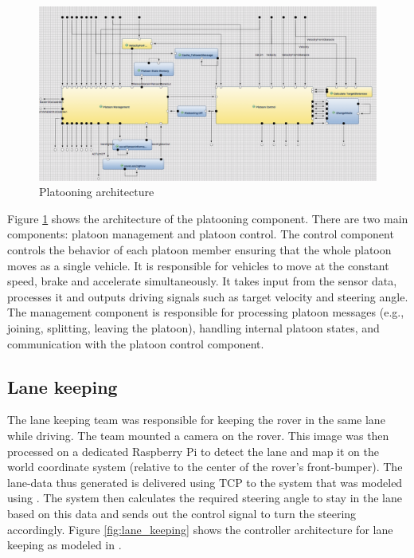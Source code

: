 \begin{figure}[!h]
	\centering
	\includegraphics[width=1\textwidth]{./img/platooningArchitecture.png}
	\caption{Platooning architecture}
	\label{fig:platooning}
\end{figure}

Figure \ref{fig:platooning} shows the architecture of the platooning component. There are two main components: platoon management and platoon control. The control component controls the behavior of each platoon member ensuring that the whole platoon moves as a single vehicle. It is responsible for vehicles to move at the constant speed, brake and accelerate simultaneously. It takes input from the sensor data, processes it and outputs driving signals such as target velocity and steering angle. The management component is responsible for processing platoon messages (e.g., joining, splitting, leaving the platoon), handling internal platoon states, and communication with the platoon control component.
 
\subsection{Lane keeping}
The lane keeping team was responsible for keeping the rover in the same lane while driving. The team mounted a camera on the rover. This image was then processed on a dedicated Raspberry Pi to detect the lane and map it on the world coordinate system (relative to the center of the rover's front-bumper). The lane-data thus generated is delivered using TCP to the system that was modeled using \af. The system then calculates the required steering angle to stay in the lane based on this data and sends out the control signal to turn the steering accordingly. Figure \ref{fig:lane_keeping} shows the controller architecture for lane keeping as modeled in \af. 

